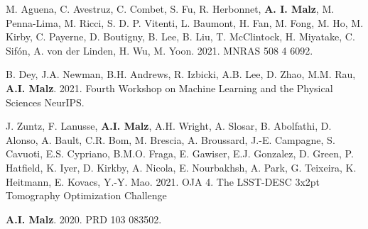 \begin{etaremune}
\item M. Aguena, C. Avestruz, C. Combet, S. Fu, R. Herbonnet, {\bf A. I. Malz}, M. Penna-Lima, M. Ricci, S. D. P. Vitenti, %
L. Baumont, H. Fan, M. Fong, M. Ho, M. Kirby, C. Payerne, D. Boutigny, B. Lee, B. Liu, T. McClintock, H. Miyatake, C. Sifón, A. von der Linden, H. Wu, M. Yoon. 
2021. MNRAS 508 4 6092. 

\item B. Dey, J.A. Newman, B.H. Andrews, R. Izbicki, A.B. Lee, D. Zhao, M.M. Rau, {\bf A.I. Malz}. 
2021. Fourth Workshop on Machine Learning and the Physical Sciences NeurIPS. 

\item J. Zuntz, F. Lanusse, \textbf{A.I. Malz}, A.H. Wright, A. Slosar, %
B. Abolfathi, D. Alonso, A. Bault, C.R. Bom, M. Brescia, A. Broussard, J.-E. Campagne, S. Cavuoti, E.S. Cypriano, B.M.O. Fraga, E. Gawiser, E.J. Gonzalez, D. Green, P. Hatfield, K. Iyer, D. Kirkby, A. Nicola, E. Nourbakhsh, A. Park, G. Teixeira, K. Heitmann, E. Kovacs, Y.-Y. Mao. 2021. OJA 4.  {The LSST-DESC 3x2pt Tomography Optimization Challenge}

\item {\bf A.I. Malz}. 2020. PRD 103 083502. 


\end{etaremune}
